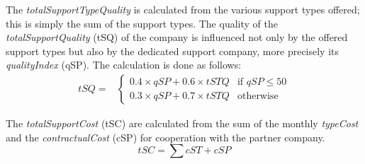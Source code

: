 The \textit{totalSupportTypeQuality} is calculated from the various support types offered; this is simply the sum of the support types. The quality of the \textit{totalSupportQuality} (\gls{tSQ}) of the company is influenced not only by the offered support types but also by the dedicated support company, more precisely its \textit{qualityIndex} (\gls{qSP}). The calculation is done as follows:
\begin{equation}
\label{func:totalProductSupport}
\begin{aligned}
    tSQ = &
    \begin{cases}
        0.4 \times qSP + 0.6 \times tSTQ & \text{if } qSP \leq  50\\
        0.3 \times qSP + 0.7 \times tSTQ & \text{otherwise}
    \end{cases}
\end{aligned}
\end{equation}

The \textit{totalSupportCost} (\gls{tSC}) are calculated from the sum of the monthly \textit{typeCost} and the \textit{contractualCost} (\gls{cSP}) for cooperation with the partner company.
\begin{equation}
\label{func:totalSupportCost}
    tSC = \sum cST + cSP
\end{equation}
